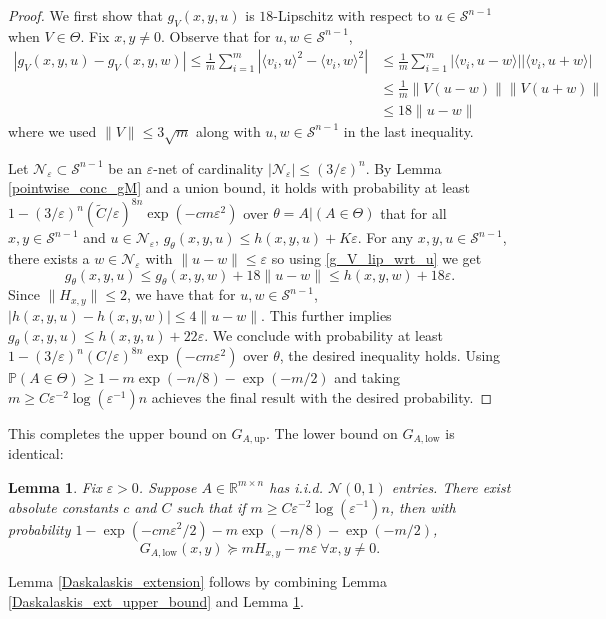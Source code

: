 \documentclass[11pt]{article}
\newcommand{\R}{\mathbb{R}}
\newcommand{\N}{\mathcal{N}}
\newcommand{\Pro}{\mathbb{P}}
\newcommand{\Scal}{\mathcal{S}}
\renewcommand{\epsilon}{\varepsilon}
\newtheorem{lemma}{Lemma}
\begin{document}
\begin{proof} We first show that $g_V(x,y,u)$ is $18$-Lipschitz with respect to $u \in \Scal^{n-1}$ when $V \in \Theta$. Fix $x,y \neq 0$. Observe that for $u,w \in \Scal^{n-1}$, \begin{align}
    |g_V(x,y,u) - g_V(x,y,w)| \leqslant \frac{1}{m}\sum_{i=1}^m |\langle v_i,u\rangle^2-\langle v_i,w\rangle^2| 
    & \leqslant\frac{1}{m}\sum_{i=1}^m|\langle v_i,u-w\rangle||\langle v_i,u+w\rangle|\nonumber \\
    & \leqslant \frac{1}{m}\|V(u-w)\|\|V(u+w)\|\nonumber\\
    &\leqslant 18\|u-w\| \label{g_V_lip_wrt_u}
\end{align} where we used $\|V\|\leqslant 3\sqrt{m}$ along with $u,w\in\Scal^{n-1}$ in the last inequality.


    Let $\N_{\epsilon}\subset \Scal^{n-1}$ be an $\epsilon$-net of cardinality $|\N_{\epsilon}| \leqslant (3/\epsilon)^n$. By Lemma \ref{pointwise_conc_gM} and a union bound, it holds with probability at least $1 - (3/\epsilon)^n(\tilde{C}/\epsilon)^{8n}\exp(-cm\epsilon^2)$ over $\theta = A|(A\in \Theta)$ that for all $x,y \in \Scal^{n-1}$ and $u \in \N_{\epsilon}$, $g_{\theta}(x,y,u) \leqslant h(x,y,u) + K\epsilon.$
For any $x,y,u \in \Scal^{n-1}$, there exists a $w \in \N_{\epsilon}$ with $\|u-w\|\leqslant \epsilon$ so using \eqref{g_V_lip_wrt_u} we get $$g_{\theta}(x,y,u) \leqslant g_{\theta}(x,y,w) + 18\|u-w\| \leqslant h(x,y,w) + 18\epsilon.$$ Since $\|H_{x,y}\|\leqslant 2$, we have that for $u,w \in \Scal^{n-1}$, $|h(x,y,u) - h(x,y,w)| \leqslant 4\|u-w\|$. This further implies $g_{\theta}(x,y,u) \leqslant h(x,y,u) +22\epsilon$. We conclude with probability at least $1 - (3/\epsilon)^n(C/\epsilon)^{8n}\exp(-cm\epsilon^2)$ over $\theta$, the desired inequality holds. Using $\Pro(A \in \Theta) \geqslant 1 - m\exp(-n/8) - \exp(-m/2)$ and taking $m \geqslant C\epsilon^{-2}\log(\epsilon^{-1})n$ achieves the final result with the desired probability.
\end{proof} 

This completes the upper bound on $G_{A,\text{up}}$. The lower bound on $G_{A,\text{low}}$ is identical: 
\begin{lemma} \label{Daskalaskis_ext_lower_bound}
Fix $\epsilon > 0$. Suppose $A \in \R^{m \times n}$ has i.i.d. $\N(0,1)$ entries. There exist absolute constants $c$ and $C$ such that if $m \geqslant C\epsilon^{-2}\log(\epsilon^{-1})n$, then with probability $1 - \exp(-cm\epsilon^2/2) - m\exp(-n/8) - \exp(-m/2)$, $$G_{A,\text{low}}(x,y) \succeq mH_{x,y} - m\epsilon\ \forall x,y\neq0.$$
\end{lemma} 
\noindent Lemma \ref{Daskalaskis_extension} follows by combining Lemma \ref{Daskalaskis_ext_upper_bound} and Lemma \ref{Daskalaskis_ext_lower_bound}.
\end{document}
